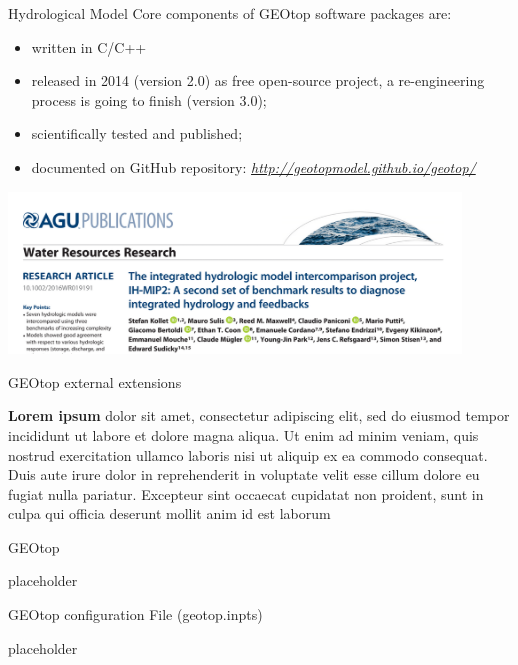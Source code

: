 \documentclass[ignorenonframetext,]{beamer}
\providecommand{\tightlist}{%
  \setlength{\itemsep}{0pt}\setlength{\parskip}{0pt}}
\begin{document}
\begin{frame}{Hydrological Model}
Core components of GEOtop software packages are:

\begin{itemize}
\tightlist
\item
  written in C/C++
\item
  released in 2014 (version 2.0) as free open-source project, a
  re-engineering process is going to finish (version 3.0);
\item
  scientifically tested and published;
\item
  documented on GitHub repository:
  \emph{\url{http://geotopmodel.github.io/geotop/}}
\end{itemize}

\includegraphics[width=0.9\textwidth,height=\textheight]{resources/images/geotop_paper_2017.png}

\end{frame}

\begin{frame}{GEOtop external extensions}
\protect\hypertarget{geotop-external-extensions}{}

\textbf{Lorem ipsum} dolor sit amet, consectetur adipiscing elit, sed do
eiusmod tempor incididunt ut labore et dolore magna aliqua. Ut enim ad
minim veniam, quis nostrud exercitation ullamco laboris nisi ut aliquip
ex ea commodo consequat. Duis aute irure dolor in reprehenderit in
voluptate velit esse cillum dolore eu fugiat nulla pariatur. Excepteur
sint occaecat cupidatat non proident, sunt in culpa qui officia deserunt
mollit anim id est laborum

\end{frame}

\begin{frame}{GEOtop}
\protect\hypertarget{geotop}{}

placeholder

\end{frame}

\begin{frame}{GEOtop configuration File (geotop.inpts)}
\protect\hypertarget{geotop-configuration-file-geotop.inpts}{}

placeholder

\end{frame}
\end{document}
